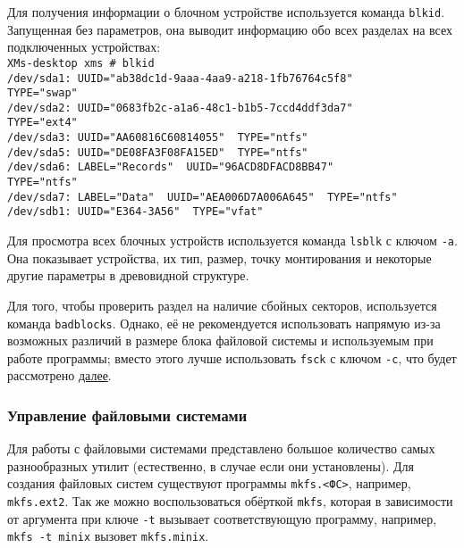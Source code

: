 Для получения информации о блочном устройстве используется команда \texttt{blkid}. Запущенная без параметров, она выводит информацию обо всех разделах на всех подключенных устройствах:\\
 \texttt{XMs-desktop xms \# blkid \\
 /dev/sda1: UUID="ab38dc1d-9aaa-4aa9-a218-1fb76764c5f8"\\ TYPE="swap"\\
 /dev/sda2: UUID="0683fb2c-a1a6-48c1-b1b5-7ccd4ddf3da7"\\ TYPE="ext4"\\
 /dev/sda3: UUID="AA60816C60814055"\, TYPE="ntfs"\\
 /dev/sda5: UUID="DE08FA3F08FA15ED"\, TYPE="ntfs"\\
 /dev/sda6: LABEL="Records"\, UUID="96ACD8DFACD8BB47"\\ TYPE="ntfs"\\
 /dev/sda7: LABEL="Data"\, UUID="AEA006D7A006A645"\, TYPE="ntfs" \\
 /dev/sdb1: UUID="E364-3A56"\, TYPE="vfat"}

Для просмотра всех блочных устройств используется команда \texttt{lsblk} с ключом \texttt{-a}. Она показывает устройства, их тип, размер, точку монтирования и некоторые другие параметры в древовидной структуре.

Для того, чтобы проверить раздел на наличие сбойных секторов, используется команда \texttt{badblocks}. Однако, её не рекомендуется использовать напрямую из-за возможных различий в размере блока файловой системы и используемым при работе программы; вместо этого лучше использовать \texttt{fsck} с ключом \texttt{-c}, что будет рассмотрено \hyperref[base:os:structure:sysutils:fs]{далее}.

\subsubsection{Управление файловыми системами}\label{base:os:structure:sysutils:fs}
Для работы с файловыми системами представлено большое количество самых разнообразных утилит (естественно, в случае если они установлены). Для создания файловых систем существуют программы \texttt{mkfs.<ФС>}, например, \texttt{mkfs.ext2}. Так же можно воспользоваться обёрткой \texttt{mkfs}, которая в зависимости от аргумента при ключе \texttt{-t} вызывает соответствующую программу, например, \texttt{mkfs -t min\-ix} вызовет \texttt{mkfs.mi\-nix}.

